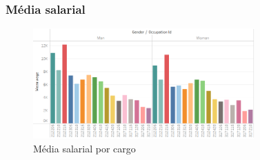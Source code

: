 \subsubsection{Média salarial}

\begin{figure}[htbp]
	\centerline{
		\includegraphics[width=85mm]{assets/5_sal_cbo.PNG}
	}
	\caption{Média salarial por cargo}
	\label{fig_5_sal_cbo}
\end{figure}